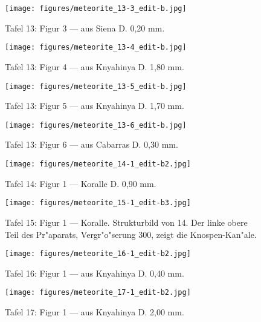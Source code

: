 \documentclass[a4paper, 11pt, oneside]{article}
\begin{document}
\clearpage
\begin{figure}[t]
\texttt{[image: figures/meteorite\_13-3\_edit-b.jpg]}
\caption{Tafel 13: Figur 3 --- aus Siena D. 0,20 mm.}
\centering
\end{figure}
\clearpage
\begin{figure}[t]
\texttt{[image: figures/meteorite\_13-4\_edit-b.jpg]}
\caption{Tafel 13: Figur 4 --- aus Knyahinya D. 1,80 mm.}
\centering
\end{figure}
\clearpage
\begin{figure}[t]
\texttt{[image: figures/meteorite\_13-5\_edit-b.jpg]}
\caption{Tafel 13: Figur 5 --- aus Knyahinya D. 1,70 mm.}
\centering
\end{figure}
\clearpage
\begin{figure}[t]
\texttt{[image: figures/meteorite\_13-6\_edit-b.jpg]}
\caption{Tafel 13: Figur 6 --- aus Cabarras D. 0,30 mm.}
\centering
\end{figure}
\clearpage
{}
\begin{figure}[t]
\texttt{[image: figures/meteorite\_14-1\_edit-b2.jpg]}
\caption{Tafel 14: Figur 1 --- Koralle D. 0,90 mm.}
\centering
\end{figure}
\clearpage
{}
\begin{figure}[t]
\texttt{[image: figures/meteorite\_15-1\_edit-b3.jpg]}
\caption{Tafel 15: Figur 1 --- Koralle. Strukturbild von 14. Der linke obere Teil des Pr"aparats, Vergr"o"serung 300, zeigt die Knospen-Kan"ale.}
\centering
\end{figure}
\clearpage
{}
\begin{figure}[t]
\texttt{[image: figures/meteorite\_16-1\_edit-b2.jpg]}
\caption{Tafel 16: Figur 1 --- aus Knyahinya D. 0,40 mm.}
\centering
\end{figure}
\clearpage
{}
\begin{figure}[t]
\texttt{[image: figures/meteorite\_17-1\_edit-b2.jpg]}
\caption{Tafel 17: Figur 1 --- aus Knyahinya D. 2,00 mm.}
\centering
\end{figure}
\clearpage
\end{document}
